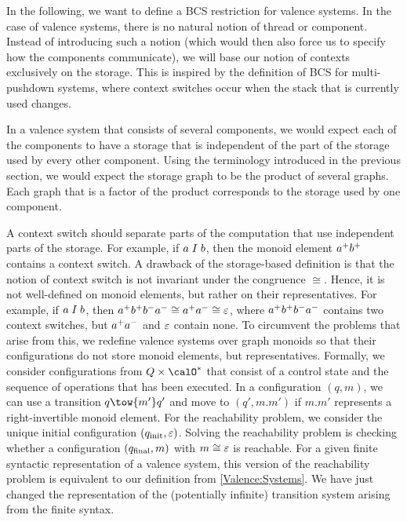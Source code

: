 \documentclass[../../diss.tex]{subfiles}
\begin{document}
In the following, we want to define a BCS restriction for valence systems.
In the case of valence systems, there is no natural notion of thread or component.
Instead of introducing such a notion (which would then also force us to specify how the components communicate), we will base our notion of contexts exclusively on the storage.
This is inspired by the definition of BCS for multi-pushdown systems, where context switches occur when the stack that is currently used changes.

In a valence system that consists of several components, we would expect each of the components to have a storage that is independent of the part of the storage used by every other component.
Using the terminology introduced in the previous section, we would expect the storage graph to be the product of several graphs.
Each graph that is a factor of the product corresponds to the storage used by one component.

A context switch should separate parts of the computation that use independent parts of the storage.
For example, if $a \mathrel{I} b$, then the monoid element ${a}^+{b}^+$ contains a context switch.
A drawback of the storage-based definition is that the notion of context switch is not invariant under the congruence $\cong$.
Hence, it is not well-defined on monoid elements, but rather on their representatives.
For example, if $a \mathrel{I} b$, then ${a}^+{b}^+{b}^-{a}^- \cong {a}^+{a}^- \cong \varepsilon$, where ${a}^+{b}^+{b}^-{a}^-$ contains two context switches, but ${a}^+{a}^-$ and $\varepsilon$ contain none.
To circumvent the problems that arise from this, we redefine valence systems over graph monoids so that their configurations do not store monoid elements, but representatives.
Formally, we consider configurations from $Q \times \ops^*$ that consist of a control state and the sequence of operations that has been executed.
In a configuration $(q,m)$, we can use a transition $q \tow{m'} q'$ and move to $(q',m.m')$ if $m.m'$ represents a right-invertible monoid element.
For the reachability problem, we consider the unique initial configuration $(q_{\text{init}},\varepsilon)$.
Solving the reachability problem is checking whether a configuration $(q_{\text{final}},m)$ with $m \cong \varepsilon$ is reachable.
For a given finite syntactic representation of a valence system, this version of the reachability problem is equivalent to our definition from \cref{Valence:Systems}.
We have just changed the representation of the (potentially infinite) transition system arising from the finite syntax.
\end{document}

